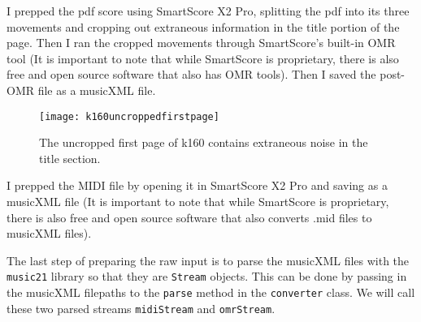 I prepped the pdf score using SmartScore X2 Pro, splitting the pdf into its three movements and cropping out extraneous information in the title portion of the page. Then I ran the cropped movements through SmartScore's built-in OMR tool (It is important to note that while SmartScore is proprietary, there is also free and open source software that also has OMR tools). Then I saved the post-OMR file as a musicXML file. 

\begin{figure}[!ht]
\centering
\texttt{[image: k160uncroppedfirstpage]}
\caption{The uncropped first page of k160 contains extraneous noise in the title section.}
\end{figure}

I prepped the MIDI file by opening it in SmartScore X2 Pro and saving as a musicXML file (It is important to note that while SmartScore is proprietary, there is also free and open source software that also converts .mid files to musicXML files).

The last step of preparing the raw input is to parse the musicXML files with the \texttt{music21} library so that they are \texttt{Stream} objects. This can be done by passing in the musicXML filepaths to the \texttt{parse} method in the \texttt{converter} class. We will call these two parsed streams \texttt{midiStream} and \texttt{omrStream}. 

\subsection{}